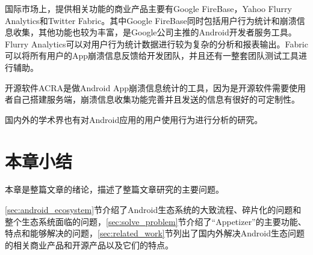国际市场上，提供相关功能的商业产品主要有Google FireBase\parencite{firebase}，Yahoo Flurry Analytics\parencite{flurry}和Twitter Fabric\parencite{fabric}。其中Google FireBase同时包括用户行为统计和崩溃信息收集，其他功能也较为丰富，是Google公司主推的Android开发者服务工具。Flurry Analytics可以对用户行为统计数据进行较为复杂的分析和报表输出。Fabric可以将所有用户的App崩溃信息反馈给开发团队，并且还有一整套团队测试工具进行辅助。

开源软件ACRA\parencite{acra}是做Android App崩溃信息统计的工具，因为是开源软件需要使用者自己搭建服务端，崩溃信息收集功能完善并且发送的信息有很好的可定制性。

国内外的学术界也有对Android应用的用户使用行为进行分析的研究\parencite{huangwenxiong,mobilyzer}。

\section{本章小结}

本章是整篇文章的绪论，描述了整篇文章研究的主要问题。

\ref{sec:android_ecosystem}节介绍了Android生态系统的大致流程、碎片化的问题和整个生态系统面临的问题，\ref{sec:solve_problem}节介绍了“Appetizer”的主要功能、特点和能够解决的问题，\ref{sec:related_work}节列出了国内外解决Android生态问题的相关商业产品和开源产品以及它们的特点。
